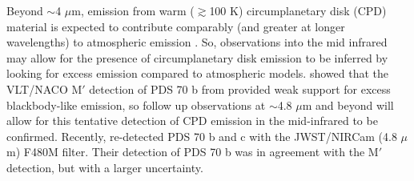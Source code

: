 \documentclass[11pt,twocolumn,twocolappendix]{aastex631}
\begin{document}











{Beyond $\sim$4 $\mu$m, emission from warm ($\gtrsim$100 K) circumplanetary disk (CPD) material is expected to contribute comparably (and greater at longer wavelengths) to atmospheric emission \citep[e.g.,][]{2021AJ....161..148W,2024arXiv240407086C}. So, observations into the mid infrared may allow for the presence of circumplanetary disk emission to be inferred by looking for excess emission compared to atmospheric models.}
\cite{2021AJ....161..148W} showed that the VLT/NACO M$'$ detection of PDS 70 b from \cite{2020A&A...644A..13S} provided weak support for excess blackbody-like emission, so follow up observations at $\sim$4.8 $\mu$m and beyond will allow for this tentative detection of CPD emission in the mid-infrared to be confirmed. Recently, \cite{2024arXiv240304855C} re-detected PDS 70 b and c with the JWST/NIRCam (4.8 $\mu$m) F480M filter. Their detection of PDS 70 b was in agreement with the M$'$ detection, but with a larger uncertainty. 
\end{document}
